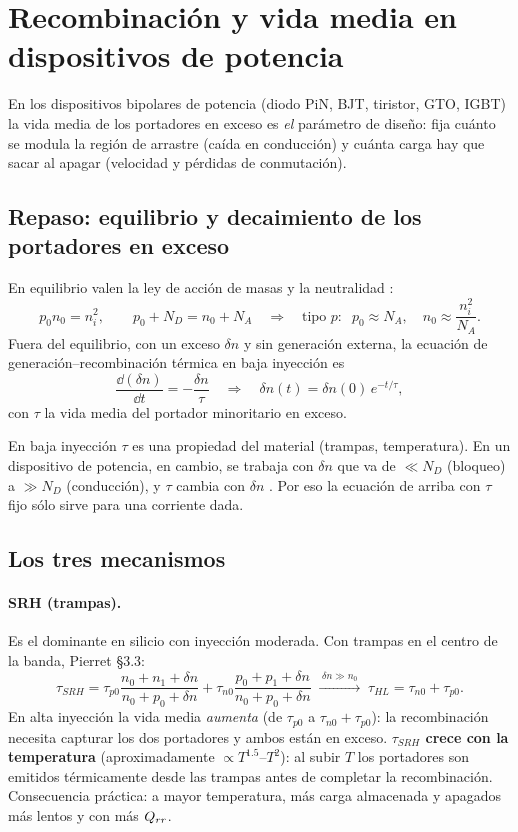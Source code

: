 \section{Recombinación y vida media en dispositivos de potencia}
\label{sec:recomb}

En los dispositivos bipolares de potencia (diodo PiN, BJT, tiristor, GTO, IGBT) la vida media de los
portadores en exceso es \emph{el} parámetro de diseño: fija cuánto se modula la región de arrastre
(caída en conducción) y cuánta carga hay que sacar al apagar (velocidad y pérdidas de conmutación).

\subsection{Repaso: equilibrio y decaimiento de los portadores en exceso}

 En equilibrio valen la ley de acción de masas y la neutralidad \enhojatexto:
\[
  p_0n_0=n_i^2,\qquad p_0+N_D=n_0+N_A
  \quad\Longrightarrow\quad
  \text{tipo }p:\;\; p_0\approx N_A,\quad n_0\approx\frac{n_i^2}{N_A}.
\]
Fuera del equilibrio, con un exceso $\delta n$ y sin generación externa, la ecuación de
generación--recombinación térmica en baja inyección es
\[
  \frac{\dd(\delta n)}{\dd t}=-\frac{\delta n}{\tau}
  \quad\Longrightarrow\quad \delta n(t)=\delta n(0)\,e^{-t/\tau},
\]
con $\tau$ la vida media del portador minoritario en exceso.

\begin{ojo}
En baja inyección $\tau$ es una propiedad del material (trampas, temperatura). En un dispositivo de
potencia, en cambio, se trabaja con $\delta n$ que va de $\ll N_D$ (bloqueo) a $\gg N_D$
(conducción), y $\tau$ cambia con $\delta n$ . Por eso la ecuación de arriba con $\tau$ fijo
sólo sirve para una corriente dada.
\end{ojo}

\subsection{Los tres mecanismos}

\paragraph{SRH (trampas).} Es el dominante en silicio con inyección moderada. Con trampas en el centro
de la banda, Pierret §3.3:
\[
  \tau_{SRH}=\tau_{p0}\frac{n_0+n_1+\delta n}{n_0+p_0+\delta n}+\tau_{n0}\frac{p_0+p_1+\delta n}{n_0+p_0+\delta n}
  \;\xrightarrow{\;\delta n\gg n_0\;}\;\tau_{HL}=\tau_{n0}+\tau_{p0}.
\]
En alta inyección la vida media \emph{aumenta} (de $\tau_{p0}$ a $\tau_{n0}+\tau_{p0}$): la
recombinación necesita capturar los dos portadores y ambos están en exceso.
\textbf{$\tau_{SRH}$ crece con la temperatura}  (aproximadamente $\propto T^{1.5}$--$T^2$):
al subir $T$ los portadores son emitidos térmicamente desde las trampas antes de completar la
recombinación. Consecuencia práctica: a mayor temperatura, más carga almacenada y apagados más
lentos y con más $Q_{rr}$.

